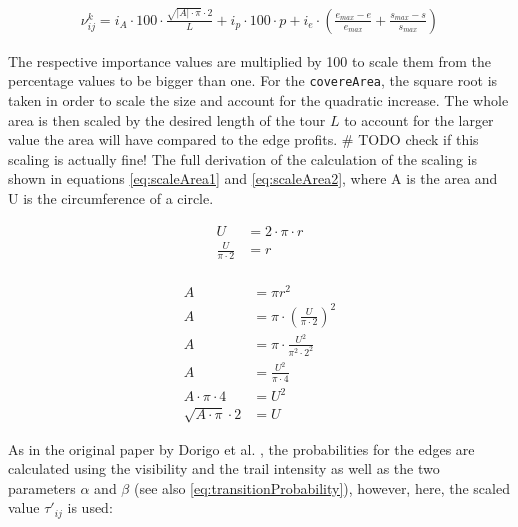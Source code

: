 \begin{equation}
	\label{eq:newEdgeVisibility}
	\begin{split}
	\nu_{ij}^k = i_A \cdot 100 \cdot \frac{\sqrt{|A|\cdot \pi} \cdot 2 }{L} 
	+  i_p \cdot 100 \cdot p
	+ i_e \cdot \left(\frac{e_{max} - e}{e_{max}} + \frac{s_{max} - s}{s_{max}}\right)
	\end{split}
\end{equation}

The respective importance values are multiplied by 100 to scale them from the percentage values to be bigger than one. 
For the \texttt{covereArea}, the square root is taken in order to scale the size and account for the quadratic increase. 
The whole area is then scaled by the desired length of the tour $L$ to account for the larger value the area will have compared to the edge profits. \# TODO check if this scaling is actually fine!
The full derivation of the calculation of the scaling is shown in equations \ref{eq:scaleArea1} and \ref{eq:scaleArea2}, where A is the area and U is the circumference of a circle.


\begin{minipage}[t][2.5cm][b]{0.4\textwidth}
	\begin{equation}
		\label{eq:scaleArea1}
		\begin{split}
			U &= 2 \cdot \pi \cdot r\\
			\frac{U}{\pi \cdot 2} &= r\\
		\end{split}
	\end{equation}
\end{minipage}
\begin{minipage}[t][2.5cm][b]{0.4\textwidth}
	\begin{equation}
		\label{eq:scaleArea2}
		\begin{split}
			A &= \pi r^2 \\
			A &= \pi \cdot \left(\frac{U}{\pi \cdot 2}\right)^2\\
			A &= \pi \cdot \frac{U^2}{\pi^2 \cdot 2^2}\\
			A &= \frac{U^2}{\pi \cdot 4}\\
			A \cdot \pi \cdot 4 &= U^2\\
			\sqrt{A \cdot \pi} \cdot 2 &= U
		\end{split}
	\end{equation}
\end{minipage}

As in the original paper by Dorigo et al. \cite{dorigo_ant_1996}, the probabilities for the edges are calculated using the visibility and the trail intensity as well as the two parameters $\alpha$ and $\beta$ (see also \ref{eq:transitionProbability}), however, here, the scaled value $\tau'_{ij}$ is used:

